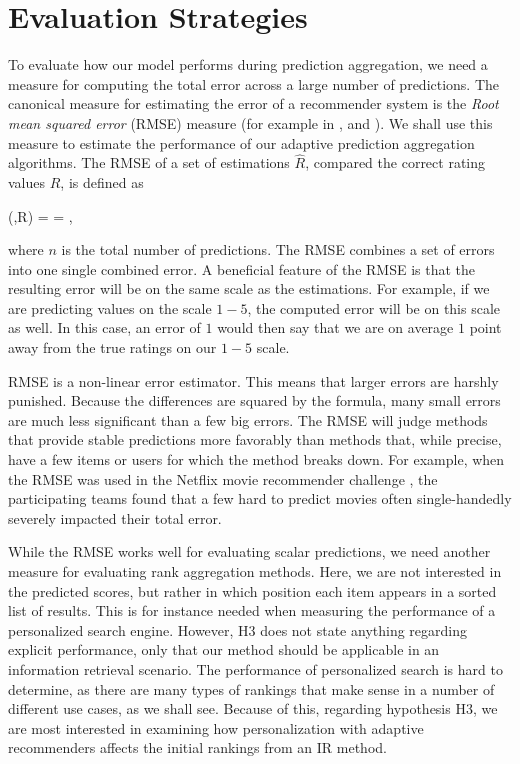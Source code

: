 \section{Evaluation Strategies}

To evaluate how our model performs during prediction aggregation, 
we need a measure for computing the total error across a large number of predictions.
The canonical measure for estimating the error of a recommender system
is the \emph{Root mean squared error} (RMSE) measure
(for example in \citet[p17]{Herlocker2004}, \citet[p13]{Adomavicius2005} and \citet[p6]{Bell2007}).
We shall use this measure to estimate the performance
of our adaptive prediction aggregation algorithms.
The RMSE of a set of estimations $\hat{R}$, 
compared the correct rating values $R$, is defined as

\begin{eqsp}
  (,R) = 
  = ,
\end{eqsp}
%
where $n$ is the total number of predictions.
The RMSE combines a set of errors into one single combined error.
A beneficial feature of the RMSE is that the resulting error 
will be on the same scale as the estimations. For example,
if we are predicting values on the scale $1-5$, the computed error
will be on this scale as well. In this case, an error of $1$
would then say that we are on average $1$ point away from the true 
ratings on our $1-5$ scale.

RMSE is a non-linear error estimator.
This means that larger errors are harshly punished.
Because the differences are squared by the formula,
many small errors are much less significant than a few big errors.
The RMSE will judge methods that provide
stable predictions more favorably
than methods that, while precise, have a few items
or users for which the method breaks down.
For example, when the RMSE was used in the Netflix movie recommender challenge
\citep{Linden2009}, the participating teams
found that a few hard to predict movies often 
single-handedly severely impacted their total error.

While the RMSE works well for evaluating scalar predictions,
we need another measure for evaluating rank aggregation methods.
Here, we are not interested in the predicted scores,
but rather in which position each item appears in a sorted list of results.
This is for instance needed when measuring the performance of a
personalized search engine.
However, H3 does not state anything regarding explicit performance,
only that our method should be applicable in an information retrieval scenario.
The performance of personalized search is hard to determine,
as there are many types of rankings that make sense in a number of different use cases,
as we shall see.
Because of this, regarding hypothesis H3, 
we are most interested in examining how  personalization with adaptive recommenders 
affects the initial rankings from an IR method.



